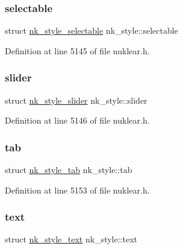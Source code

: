 \subsubsection{\texorpdfstring{selectable}{selectable}}
{\footnotesize\ttfamily struct \mbox{\hyperlink{structnk__style__selectable}{nk\+\_\+style\+\_\+selectable}} nk\+\_\+style\+::selectable}



Definition at line 5145 of file nuklear.\+h.

\mbox{\label{structnk__style_ac3f3abfee5be6a0fa96f8cbf0c63d77e}} 
\subsubsection{\texorpdfstring{slider}{slider}}
{\footnotesize\ttfamily struct \mbox{\hyperlink{structnk__style__slider}{nk\+\_\+style\+\_\+slider}} nk\+\_\+style\+::slider}



Definition at line 5146 of file nuklear.\+h.

\mbox{\label{structnk__style_a50ba7d1509135829d80fe1448cbff2b1}} 
\subsubsection{\texorpdfstring{tab}{tab}}
{\footnotesize\ttfamily struct \mbox{\hyperlink{structnk__style__tab}{nk\+\_\+style\+\_\+tab}} nk\+\_\+style\+::tab}



Definition at line 5153 of file nuklear.\+h.

\mbox{\label{structnk__style_a3a84db8a7418bf259f60be1d10bd54ed}} 
\subsubsection{\texorpdfstring{text}{text}}
{\footnotesize\ttfamily struct \mbox{\hyperlink{structnk__style__text}{nk\+\_\+style\+\_\+text}} nk\+\_\+style\+::text}



